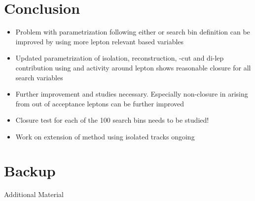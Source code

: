 \documentclass{beamer}
\begin{document}
\section{Conclusion}
\begin{frame}
 \begin{itemize}
 \item Problem with parametrization following either \NJets or \BTags search bin definition can be improved by using more lepton relevant based variables
 \item Updated parametrization of isolation, reconstruction, \mt-cut and di-lep contribution using \pt and activity around lepton shows reasonable closure for all search variables
 \item Further improvement and studies necessary. Especially non-closure in \NJets arising from out of acceptance leptons can be further improved
 \item Closure test for each of the 100 search bins needs to be studied!
 \item Work on extension of method using isolated tracks ongoing
 \end{itemize}

\end{frame}


\section{Backup}
\begin{frame}
  \begin{center}
    {\Large Additional Material}
  \end{center}
\end{frame}

\end{document}

